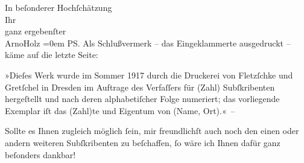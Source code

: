 \pstart
           In beſonderer Hochſchätzung{\\[\baselineskip]}Ihr{\\[\baselineskip]}ganz ergebenſter{\\[\baselineskip]}\spacefill\mbox{ArnoHolz}\pend
           \leftskip=0em{}
\pstart
           PS. Als Schlußvermerk – das Eingeklammerte ausgedruckt – käme auf die letzte
               Seite:\pend
           
\pstart
           »Dieſes Werk wurde im Sommer 1917 durch die Druckerei von Fletzſchke und Gretſchel in Dresden im Auftrage des Verfaſſers für (Zahl) Subſkribenten
               hergeſtellt und nach deren alphabetiſcher Folge numeriert; das vorliegende Exemplar
               iſt das (Zahl)te und Eigentum von (Name, Ort).« –\pend
           
\pstart
           Sollte es Ihnen zugleich möglich ſein, mir freundlichſt auch noch den einen oder
               andern weiteren Subſkribenten zu beſchaffen, ſo wäre ich Ihnen dafür ganz beſonders
               dankbar!\pend
           \endnumbering{}  
      